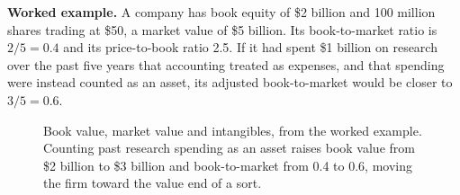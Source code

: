 \textbf{Worked example.} A company has book equity of \$2 billion and 100 million shares trading at \$50, a market value of \$5 billion. Its book-to-market ratio is $2/5 = 0.4$ and its price-to-book ratio 2.5. If it had spent \$1 billion on research over the past five years that accounting treated as expenses, and that spending were instead counted as an asset, its adjusted book-to-market would be closer to $3/5 = 0.6$.



\begin{figure}[!htbp]
  \centering
\caption{Book value, market value and intangibles, from the worked example. Counting past research spending as an asset raises book value from \$2 billion to \$3 billion and book-to-market from 0.4 to 0.6, moving the firm toward the value end of a sort.}
\label{fig:08-book}
\end{figure}

